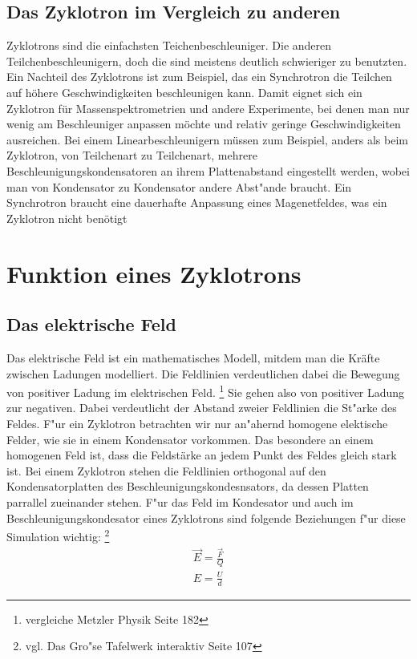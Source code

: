 \documentclass[14pt, a4paper]{report}
\begin{document}
\section{Das Zyklotron im Vergleich zu anderen}
Zyklotrons sind die einfachsten Teichenbeschleuniger. Die anderen 
Teilchenbeschleunigern, doch die sind meistens deutlich schwieriger zu benutzten. 
Ein Nachteil des Zyklotrons ist zum Beispiel, das ein Synchrotron die Teilchen auf 
höhere Geschwindigkeiten beschleunigen kann. Damit eignet sich ein Zyklotron für 
Massenspektrometrien und andere Experimente, bei denen man nur wenig am 
Beschleuniger anpassen möchte und relativ geringe Geschwindigkeiten ausreichen. 
Bei einem Linearbeschleunigern müssen zum Beispiel, anders als beim Zyklotron, von 
Teilchenart zu Teilchenart, mehrere Beschleunigungskondensatoren an ihrem 
Plattenabstand eingestellt werden, wobei man von Kondensator zu Kondensator andere
Abst"ande braucht. Ein Synchrotron braucht eine dauerhafte Anpassung eines 
Magenetfeldes, was ein Zyklotron nicht benötigt

\chapter{Funktion eines Zyklotrons}
\section{Das elektrische Feld}
Das elektrische Feld ist ein mathematisches Modell, mitdem man die Kräfte zwischen
Ladungen modelliert. Die Feldlinien verdeutlichen dabei die Bewegung von positiver 
Ladung im elektrischen Feld. \footnote{vergleiche Metzler Physik Seite 182}
Sie gehen also von positiver Ladung zur negativen. Dabei verdeutlicht der Abstand zweier
Feldlinien die St"arke des Feldes. F"ur ein Zyklotron betrachten wir nur an"ahernd
homogene elektische Felder, wie sie in einem Kondensator vorkommen. Das besondere an 
einem homogenen Feld ist, dass die Feldstärke an jedem Punkt des Feldes gleich stark 
ist. Bei einem Zyklotron stehen die Feldlinien orthogonal auf den Kondensatorplatten
des Beschleunigungskondesnsators, da dessen Platten parrallel zueinander stehen.
F"ur das Feld im Kondesator und auch im Beschleunigungskondesator eines Zyklotrons
sind folgende Beziehungen f"ur diese Simulation wichtig:
\footnote{vgl. Das Gro"se Tafelwerk interaktiv Seite 107}
\begin{eqnarray}
\vec{E} = \frac{\vec{F}}{Q} \\
E = \frac{U}{d}
\end{eqnarray}
\end{document}
